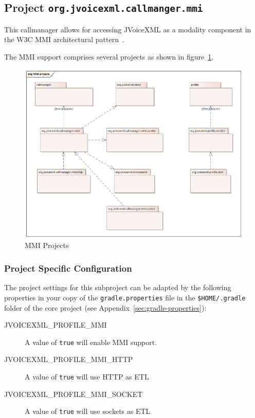 \documentclass[11pt,a4paper]{article}
\begin{document}
\subsection{Project \texttt{org.jvoicexml.callmanger.mmi}}

This callmanager allows for accessing JVoiceXML as a modality component in
the W3C MMI architectural pattern~\cite{w3c:2012:mmi_arch}.

The MMI support comprises several projects as shown in figure~\ref{fig:MMI-projects}.
\begin{figure}
\includegraphics[width=\linewidth]{MMI-projects.png}
\caption{MMI Projects}
\label{fig:MMI-projects}
\end{figure}

\subsubsection{Project Specific Configuration}

The project settings for this subproject can be adapted by the following 
properties in your copy of the \texttt{gradle.properties} file in the
\texttt{\${HOME}/.gradle} folder of the core project (see 
Appendix~\ref{sec:gradle-properties}):

\begin{description}
\item[JVOICEXML\_PROFILE\_MMI] A value of \texttt{true} will enable MMI support.
\item[JVOICEXML\_PROFILE\_MMI\_HTTP] A value of \texttt{true} will use HTTP as ETL
\item[JVOICEXML\_PROFILE\_MMI\_SOCKET] A value of \texttt{true} will use sockets as ETL
\end{description}
\end{document}
